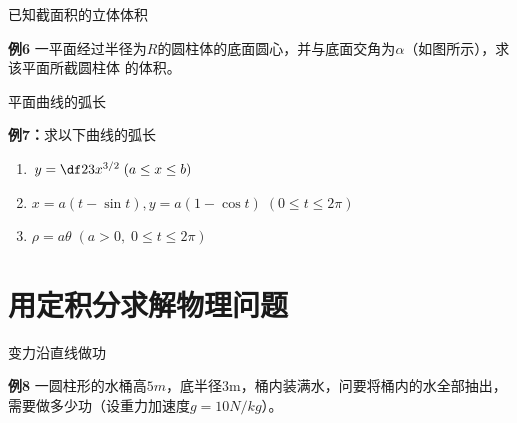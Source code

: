 \begin{frame}{已知截面积的立体体积}
	\linespread{1.2}
	\begin{exampleblock}{{\bf 例6}\hfill}
		一平面经过半径为$R$的圆柱体的底面圆心，并与底面交角为$\alpha$（如图所示），求该平面所截圆柱体
		的体积。
	\end{exampleblock}\pause 
	\begin{center}
	\end{center}
\end{frame}

\begin{frame}{平面曲线的弧长}
	\linespread{2}
	\begin{exampleblock}{{\bf 例7：}求以下曲线的弧长\hfill}\pause 
		\begin{enumerate}
		  \item $y=\df 23x^{3/2}\;(a\leq x\leq b)$\pause 
		  \item $x=a(t-\sin t),y=a(1-\cos t)\;(0\leq t\leq 2\pi)$\pause 
		  \item $\rho=a\theta\;(a>0,\;0\leq t\leq 2\pi)$
		\end{enumerate}
	\end{exampleblock}
\end{frame}

\section{用定积分求解物理问题}

\begin{frame}{变力沿直线做功}
	\linespread{1.2}
	\begin{exampleblock}{{\bf 例8}\hfill}
		一圆柱形的水桶高$5m$，底半径$3$m，桶内装满水，问要将桶内的水全部抽出，需要做多少功（设重力加速度$g=10N/kg$）。
	\end{exampleblock}
\end{frame}

